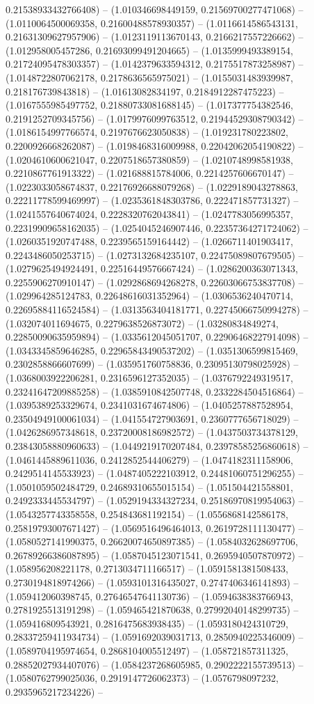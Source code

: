 0.21538933432766408) -- (1.010346698449159, 0.21569700277471068) -- (1.0110064500069358, 0.21600488578930357) -- (1.0116614586543131, 0.21631309627957906) -- (1.0123119113670143, 0.2166217557226662) -- (1.012958005457286, 0.21693099491204665) -- (1.0135999493389154, 0.21724095478303357) -- (1.0142379633594312, 0.2175517873258987) -- (1.0148722807062178, 0.2178636565975021) -- (1.0155031483939987, 0.218176739843818) -- (1.01613082834197, 0.2184912287475223) -- (1.0167555985497752, 0.21880733081688145) -- (1.017377754382546, 0.2191252709345756) -- (1.0179976099763512, 0.21944529308790342) -- (1.0186154997766574, 0.2197676623050838) -- (1.019231780223802, 0.2200926668262087) -- (1.0198468316009988, 0.22042062054190822) -- (1.0204610600621047, 0.2207518657380859) -- (1.0210748998581938, 0.2210867761913322) -- (1.021688815784006, 0.2214257606670147) -- (1.0223033058674837, 0.22176926688079268) -- (1.0229189043278863, 0.22211778599469997) -- (1.0235361848303786, 0.222471857731327) -- (1.0241557640674024, 0.2228320762043841) -- (1.0247783056995357, 0.22319909658162035) -- (1.0254045246907446, 0.22357364271724062) -- (1.0260351920747488, 0.2239565159164442) -- (1.0266711401903417, 0.2243486050253715) -- (1.0273132684235107, 0.22475089807679505) -- (1.0279625494924491, 0.22516449576667424) -- (1.0286200363071343, 0.2255906270910147) -- (1.0292868694268278, 0.22603066753837708) -- (1.029964285124783, 0.22648616031352964) -- (1.0306536240470714, 0.22695884116524584) -- (1.0313563404181771, 0.22745066750994278) -- (1.032074011694675, 0.2279638526873072) -- (1.03280834849274, 0.22850090635959894) -- (1.0335612045051707, 0.22906468227914098) -- (1.0343345859646285, 0.22965843490537202) -- (1.0351306599815469, 0.2302858866607699) -- (1.035951760758836, 0.23095130798025928) -- (1.0368003922206281, 0.2316596127352035) -- (1.0376792249319517, 0.23241647209885258) -- (1.0385910842507748, 0.2332284504516864) -- (1.0395389253329674, 0.2341031674674806) -- (1.0405257887528954, 0.23504949100061034) -- (1.041554727903691, 0.2360777656718029) -- (1.0426286957348618, 0.23720008186982572) -- (1.0437503734378129, 0.23843058880960633) -- (1.0449219170207484, 0.23978585256860618) -- (1.0461445889611036, 0.2412852544406279) -- (1.0474182311158906, 0.2429514145533923) -- (1.0487405222103912, 0.24481060751296255) -- (1.0501059502484729, 0.24689310655015154) -- (1.051504421558801, 0.2492333445534797) -- (1.0529194334327234, 0.25186970819954063) -- (1.0543257743358558, 0.254843681192154) -- (1.0556868142586178, 0.25819793007671427) -- (1.0569516496464013, 0.2619728111130477) -- (1.0580527141990375, 0.26620074650897385) -- (1.0584032628697706, 0.26789266386087895) -- (1.0587045123071541, 0.2695940507870972) -- (1.058956208221178, 0.2713034711166517) -- (1.0591581381508433, 0.2730194818974266) -- (1.0593101316435027, 0.2747406346141893) -- (1.059412060398745, 0.27646547641130736) -- (1.0594638383766943, 0.2781925513191298) -- (1.059465421870638, 0.27992040148299735) -- (1.059416809543921, 0.2816475683938435) -- (1.0593180424310729, 0.28337259411934734) -- (1.0591692039031713, 0.2850940225346009) -- (1.0589704195974654, 0.2868104005512497) -- (1.058721857311325, 0.28852027934407076) -- (1.0584237268605985, 0.2902222155739513) -- (1.0580762799025036, 0.2919147726062373) -- (1.0576798097232, 0.2935965217234226) -- 